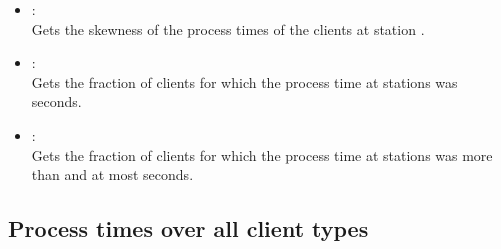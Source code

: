 \begin{itemize}
\item
{}:\\
Gets the skewness of the process times of the clients at station .

\item
{}:\\
Gets the fraction of clients for which the process time at stations  was  seconds.

\item
{}:\\
Gets the fraction of clients for which the process time at stations  was more than  and at most  seconds.

\end{itemize}



\subsection{Process times over all client types}

